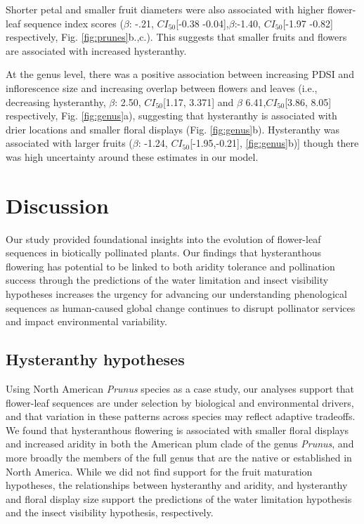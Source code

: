 \documentclass{article}[11pt]
\begin{document}
{Shorter petal and smaller fruit diameters were also associated with higher flower-leaf sequence index scores ($\beta$: -.21, $CI_{50}$[-0.38 -0.04],$\beta$:-1.40, $CI_{50}$[-1.97 -0.82] respectively, Fig. \ref{fig:prunes}b.,c.). This suggests that smaller fruits and flowers are associated with increased hysteranthy.

At the genus level, there was a positive association between increasing PDSI and inflorescence size and increasing overlap between flowers and leaves (i.e., decreasing hysteranthy, $\beta$: 2.50, $CI_{50}$[1.17, 3.371] and $\beta$ 6.41,$CI_{50}$[3.86, 8.05] respectively, Fig. \ref{fig:genus}a), suggesting that hysteranthy is associated with drier locations and smaller floral displays (Fig. \ref{fig:genus}b). Hysteranthy was associated with larger fruits  ($\beta$: -1.24, $CI_{50}$[-1.95,-0.21], \ref{fig:genus}b)]  though there was high uncertainty around these estimates in our model. 

\section*{Discussion}
Our study provided foundational insights into the evolution of flower-leaf sequences in biotically pollinated plants.%
Our findings that hysteranthous flowering has potential to be linked to both aridity tolerance and  pollination success through the predictions of the water limitation and insect visibility hypotheses increases the urgency for advancing our understanding phenological sequences as human-caused global change continues to disrupt pollinator services and impact environmental variability. 

\subsection*{Hysteranthy hypotheses}
Using North American \textit{Prunus} species as a case study, our analyses support that flower-leaf sequences are under selection by biological and environmental drivers, and that variation in these patterns across species may reflect adaptive tradeoffs. We found that hysteranthous flowering is associated with smaller floral displays and increased aridity in both the American plum clade of the genus \emph{Prunus}, and more broadly the members of the full genus that are the native or established in North America. While we did not find support for the fruit maturation hypotheses, the relationships between hysteranthy and aridity, and hysteranthy and floral display size support the predictions of the water limitation hypothesis and the insect visibility hypothesis, respectively. 

}
\end{document}
